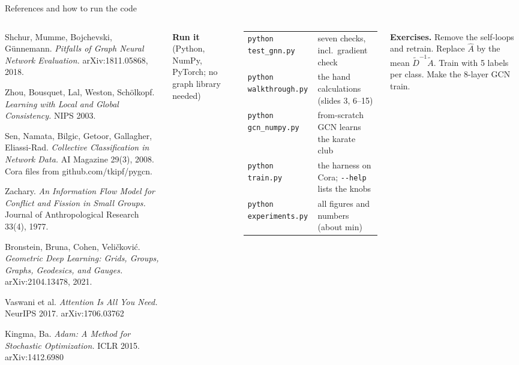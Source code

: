 \documentclass[aspectratio=169,10pt]{beamer}
\newcommand{\Ah}{\hat A}
\newcommand{\At}{\tilde A}
\newcommand{\Dt}{\tilde D}
\begin{document}
\begin{frame}{References and how to run the code}
\begin{columns}[T,onlytextwidth]
\begin{enumerate}[{[1]}]
\item Shchur, Mumme, Bojchevski, G\"unnemann. \emph{Pitfalls of Graph Neural Network Evaluation.} arXiv:1811.05868, 2018.
\item Zhou, Bousquet, Lal, Weston, Sch\"olkopf. \emph{Learning with Local and Global Consistency.} NIPS 2003.
\item Sen, Namata, Bilgic, Getoor, Gallagher, Eliassi-Rad. \emph{Collective Classification in Network Data.} AI Magazine 29(3), 2008. Cora files from github.com/tkipf/pygcn.
\item Zachary. \emph{An Information Flow Model for Conflict and Fission in Small Groups.} Journal of Anthropological Research 33(4), 1977.
\item Bronstein, Bruna, Cohen, Veli\v{c}kovi\'c. \emph{Geometric Deep Learning: Grids, Groups, Graphs, Geodesics, and Gauges.} arXiv:2104.13478, 2021.
\item Vaswani et al. \emph{Attention Is All You Need.} NeurIPS 2017. arXiv:1706.03762
\item Kingma, Ba. \emph{Adam: A Method for Stochastic Optimization.} ICLR 2015. arXiv:1412.6980
\end{enumerate}

\vspace{0.5mm}
{\fontsize{6.6}{8.1}\selectfont\color{cInk}
\textbf{Run it} (Python, NumPy, PyTorch; no graph library needed)

\vspace{0.5mm}
\begin{tabular}{@{}l>{\raggedright\arraybackslash}p{50mm}@{}}
\texttt{python test\_gnn.py} & seven checks, incl.\ gradient check\\
\texttt{python walkthrough.py} & the hand calculations (slides 3, 6--15)\\
\texttt{python gcn\_numpy.py} & from-scratch GCN learns the karate club\\
\texttt{python train.py} & the harness on Cora; \texttt{-{}-help} lists the knobs\\
\texttt{python experiments.py} & all figures and numbers (about \experimentMinutes{} min)\\
\end{tabular}

\vspace{1mm}
\textbf{Exercises.} Remove the self-loops and retrain. Replace $\Ah$ by the mean $\Dt^{-1}\At$.
Train with 5 labels per class. Make the 8-layer GCN train.}
\end{columns}
\end{frame}
\end{document}
